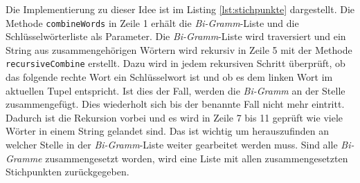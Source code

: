 Die Implementierung zu dieser Idee ist im Listing \ref{lst:stichpunkte} dargestellt. Die Methode \lstinline{combineWords} in Zeile 1 erhält die \emph{Bi-Gramm}-Liste und die Schlüsselwörterliste als Parameter. Die \emph{Bi-Gramm}-Liste wird traversiert und ein String aus zusammengehörigen Wörtern wird rekursiv in Zeile 5 mit der Methode \lstinline{recursiveCombine} erstellt. Dazu wird in jedem rekursiven Schritt überprüft, ob das folgende rechte Wort ein Schlüsselwort ist und ob es dem linken Wort im aktuellen Tupel entspricht. Ist dies der Fall, werden die \emph{Bi-Gramm} an der Stelle zusammengefügt. Dies wiederholt sich bis der benannte Fall nicht mehr eintritt. Dadurch ist die Rekursion vorbei und es wird in Zeile 7 bis 11 geprüft wie viele Wörter in einem String gelandet sind. Das ist wichtig um herauszufinden an welcher Stelle in der \emph{Bi-Gramm}-Liste weiter gearbeitet werden muss. Sind alle \emph{Bi-Gramme} zusammengesetzt worden, wird eine Liste mit allen zusammengesetzten Stichpunkten zurückgegeben.
